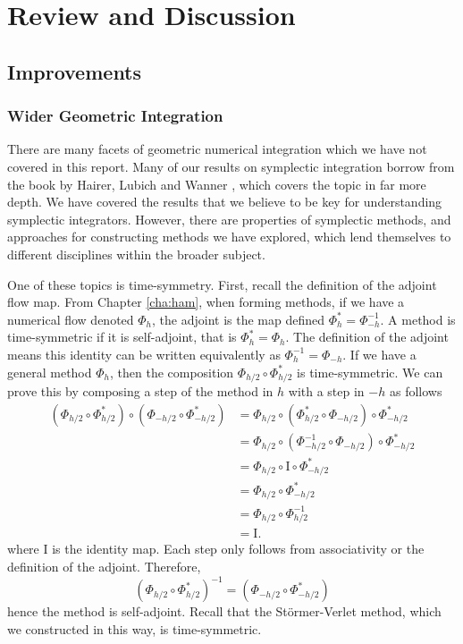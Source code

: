 \chapter{Review and Discussion}

\section{Improvements}

\subsection{Wider Geometric Integration}

There are many facets of geometric numerical integration which we have not covered in this report.
Many of our results on symplectic integration borrow from the book by Hairer, Lubich and Wanner \cite{gni2006}, which covers the topic in far more depth.
We have covered the results that we believe to be key for understanding symplectic integrators.
However, there are properties of symplectic methods, and approaches for constructing methods we have explored, which lend themselves to different disciplines within the broader subject.

One of these topics is time-symmetry.
First, recall the definition of the adjoint flow map.
From Chapter \ref{cha:ham}, when forming methods, if we have a numerical flow denoted $\Phi_h$, the adjoint is the map defined $\Phi_h^* = \Phi_{-h}^{-1}$.
A method is time-symmetric if it is self-adjoint, that is $\Phi_h^* = \Phi_h$.
The definition of the adjoint means this identity can be written equivalently as $\Phi_h^{-1} = \Phi_{-h}$.
If we have a general method $\Phi_h$, then the composition $\Phi_{h/2} \circ \Phi_{h/2}^*$ is time-symmetric.
We can prove this by composing a step of the method in $h$ with a step in $-h$ as follows
\begin{align*}
    \left( \Phi_{h/2} \circ \Phi_{h/2}^* \right) \circ \left( \Phi_{-h/2} \circ \Phi_{-h/2}^* \right) &= \Phi_{h/2} \circ \left( \Phi_{h/2}^* \circ \Phi_{-h/2} \right) \circ \Phi_{-h/2}^* \\
    &= \Phi_{h/2} \circ \left( \Phi_{-h/2}^{-1} \circ \Phi_{-h/2} \right) \circ \Phi_{-h/2}^* \\
    &= \Phi_{h/2} \circ \mathrm{I} \circ \Phi_{-h/2}^* \\
    &= \Phi_{h/2} \circ \Phi_{-h/2}^* \\
    &= \Phi_{h/2} \circ \Phi_{h/2}^{-1} \\
    &= \mathrm{I}.
\end{align*}
where $\mathrm{I}$ is the identity map. Each step only follows from associativity or the definition of the adjoint.
Therefore,
\begin{equation*}
    \left( \Phi_{h/2} \circ \Phi_{h/2}^* \right)^{-1} = \left( \Phi_{-h/2} \circ \Phi_{-h/2}^* \right)
\end{equation*}
hence the method is self-adjoint.
Recall that the St\"ormer-Verlet method, which we constructed in this way, is time-symmetric.

